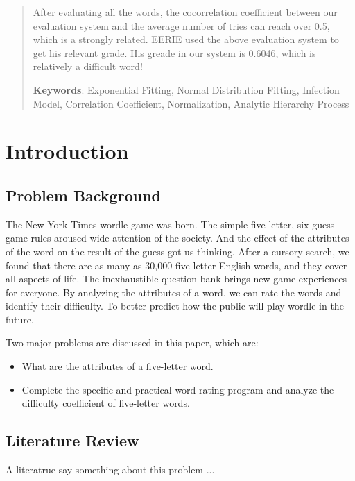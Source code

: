 \documentclass[12pt]{article}  %
\begin{document}
\begin{abstract}
After evaluating all the words, the cocorrelation coefficient between our evaluation system and the average number of tries can reach over 0.5, which is a strongly related. EERIE used the above evaluation system to get his relevant grade. His greade in our system is 0.6046, which is relatively a difficult word!




     \vspace{5pt}
     \textbf{Keywords}: Exponential Fitting, Normal Distribution Fitting, Infection Model, Correlation Coefficient, Normalization, Analytic Hierarchy Process 

\end{abstract}

\maketitle  %
\tableofcontents  %


\section{Introduction}
\subsection{Problem Background}
The New York Times wordle game was born. The simple five-letter, six-guess game rules aroused wide attention of the society. And the effect of the attributes of the word on the result of the guess got us thinking. After a cursory search, we found that there are as many as 30,000 five-letter English words, and they cover all aspects of life. The inexhaustible question bank brings new game experiences for everyone. By analyzing the attributes of a word, we can rate the words and identify their difficulty. To better predict how the public will play wordle in the future.


Two major problems are discussed in this paper, which are:
\begin{itemize}
     \item What are the attributes of a five-letter word.
    \item Complete the specific and practical word rating program and analyze the difficulty coefficient of five-letter words.
\end{itemize}

\subsection{Literature Review}
A literatrue\cite{1} say something about this problem ...
\end{document}
